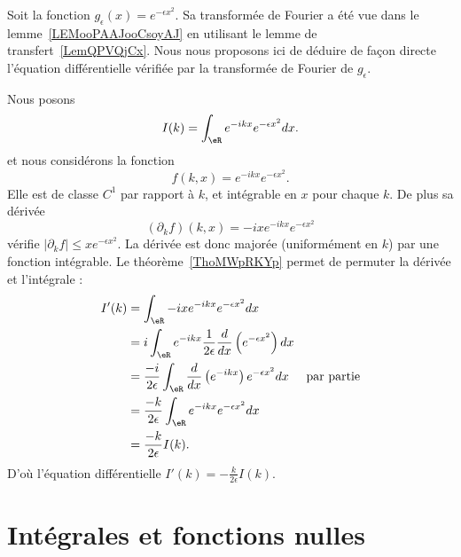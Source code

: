 \begin{example} \label{EXooLMXKooFcAZGR}
	Soit la fonction \( g_{\epsilon}(x)= e^{-\epsilon x^2}\). Sa transformée de Fourier a été vue dans le lemme~\ref{LEMooPAAJooCsoyAJ} en utilisant le lemme de transfert~\ref{LemQPVQjCx}. Nous nous proposons ici de déduire de façon directe l'équation différentielle vérifiée par la transformée de Fourier de \( g_{\epsilon}\).

	Nous posons
	\begin{equation}
		I(k)=\int_{\eR} e^{-ikx} e^{-\epsilon x^2}dx.
	\end{equation}
	et nous considérons la fonction
	\begin{equation}
		f(k,x)= e^{-ikx} e^{-\epsilon x^2}.
	\end{equation}
	Elle est de classe \( C^1\) par rapport à \( k\), et intégrable en \( x\) pour chaque \( k\). De plus sa dérivée
	\begin{equation}
		(\partial_k f)(k,x)=-ix e^{-ikx} e^{-\epsilon x^2}
	\end{equation}
	vérifie \( | \partial_kf |\leq x e^{-\epsilon x^2}\). La dérivée est donc majorée (uniformément en \( k\)) par une fonction intégrable. Le théorème~\ref{ThoMWpRKYp} permet de permuter la dérivée et l'intégrale :
	\begin{subequations}
		\begin{align}
			I'(k) & =\int_{\eR}-ix e^{-ikx} e^{-\epsilon x^2}dx                                                                         \\
			      & =i\int_{\eR} e^{-ikx}\frac{1}{ 2\epsilon } \frac{ d  }{ dx }\left(  e^{-\epsilon x^2} \right)dx                     \\
			      & =\frac{ -i }{ 2\epsilon }\int_{\eR}\frac{ d }{ dx }\left(  e^{-ikx} \right) e^{-\epsilon x^2}dx & \text{par partie} \\
			      & =\frac{ -k }{ 2\epsilon }\int_{\eR} e^{-ikx} e^{-\epsilon x^2}dx                                                    \\
			      & =\frac{ -k }{ 2\epsilon }I(k).
		\end{align}
	\end{subequations}
	D'où l'équation différentielle \( I'(k)=-\frac{ k }{ 2\epsilon }I(k)\).
\end{example}



\section{Intégrales et fonctions nulles}


